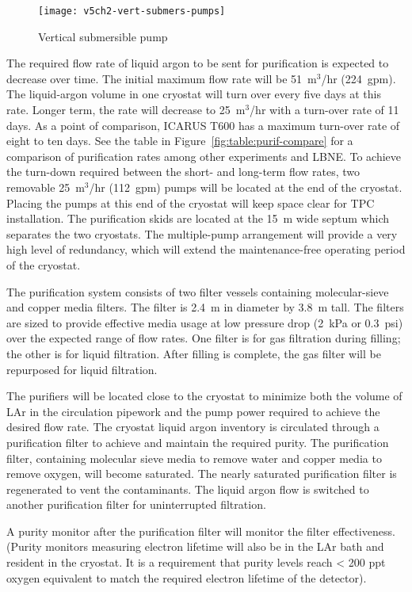 \begin{figure}[htbp]
\centering
\texttt{[image: v5ch2-vert-submers-pumps]}
\caption{Vertical submersible pump }
\label{fig:vert-submers-pumps}
\end{figure}

The required flow rate of liquid argon to be sent for purification is expected to decrease over time.  The 
initial maximum flow rate will be 51~m$^3$/hr (224~gpm).  The liquid-argon volume in one cryostat will turn over every five days at this rate. 
 Longer term, the rate will decrease to 25~m$^3$/hr with a turn-over rate of 11 days.  As a point of comparison, ICARUS T600 has a maximum turn-over rate of eight to ten days. See the table in Figure~\ref{fig:table:purif-compare} for a comparison of purification rates among other  experiments and LBNE. To achieve the turn-down required between the short- and long-term flow rates, two removable 25~m$^3$/hr (112~gpm) pumps will be located at the end of the cryostat.  Placing the pumps at this end of the cryostat will keep space clear for TPC installation. The purification skids are located at the 15~m wide septum which separates the two cryostats.  The multiple-pump arrangement will provide a very high level of redundancy, which will extend the maintenance-free operating period of the cryostat.  


The purification system consists of two filter vessels containing molecular-sieve and copper media filters. The filter is 2.4~m in diameter by 3.8~m tall. The filters are sized to provide effective media usage at low pressure drop (2~kPa or 0.3~psi) over the expected range of flow rates. 
One filter is for gas filtration during filling; the other is for liquid filtration. After filling is complete, the gas filter will be repurposed for liquid filtration.

The 
purifiers will be located close to the cryostat to minimize both the volume of LAr in the circulation pipework 
and the pump power required to achieve the desired flow rate.  
The cryostat liquid argon inventory is circulated through a purification filter to achieve and maintain the required purity. The purification filter, containing molecular sieve media to remove water and copper media to remove oxygen, will become saturated.
The nearly saturated purification filter is regenerated to vent the contaminants. The liquid argon flow is switched to another purification filter for uninterrupted filtration. 

A purity monitor after the purification filter will monitor the filter effectiveness. (Purity monitors measuring electron lifetime will also be in the LAr bath and resident in the cryostat.  It is a requirement that purity levels reach < 200 ppt oxygen equivalent to match the required electron lifetime of the detector). 

